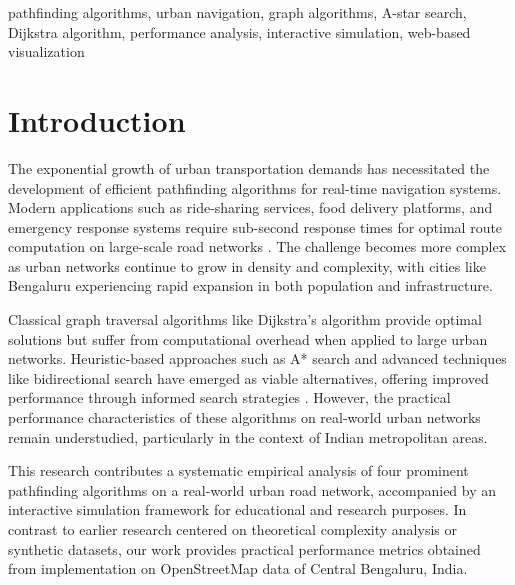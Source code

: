 \documentclass[conference]{IEEEtran}
\begin{document}
\begin{IEEEkeywords}
pathfinding algorithms, urban navigation, graph algorithms, A-star search, Dijkstra algorithm, performance analysis, interactive simulation, web-based visualization
\end{IEEEkeywords}

\section{Introduction}

The exponential growth of urban transportation demands has necessitated the development of efficient pathfinding algorithms for real-time navigation systems. Modern applications such as ride-sharing services, food delivery platforms, and emergency response systems require sub-second response times for optimal route computation on large-scale road networks \cite{dijkstra1959note}. The challenge becomes more complex as urban networks continue to grow in density and complexity, with cities like Bengaluru experiencing rapid expansion in both population and infrastructure.

Classical graph traversal algorithms like Dijkstra's algorithm provide optimal solutions but suffer from computational overhead when applied to large urban networks. Heuristic-based approaches such as A* search and advanced techniques like bidirectional search have emerged as viable alternatives, offering improved performance through informed search strategies \cite{hart1968formal}. However, the practical performance characteristics of these algorithms on real-world urban networks remain understudied, particularly in the context of Indian metropolitan areas.

This research contributes a systematic empirical analysis of four prominent pathfinding algorithms on a real-world urban road network, accompanied by an interactive simulation framework for educational and research purposes. In contrast to earlier research centered on theoretical complexity analysis or synthetic datasets, our work provides practical performance metrics obtained from implementation on OpenStreetMap data of Central Bengaluru, India.
\end{document}
